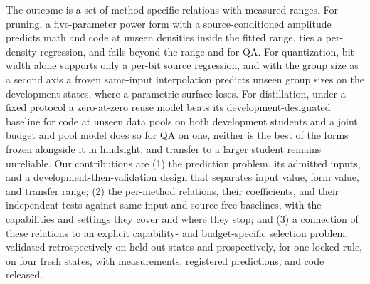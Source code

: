 The outcome is a set of method-specific relations with measured
ranges. For pruning, a five-parameter power form with a
source-conditioned amplitude predicts math and code at unseen
densities inside the fitted range, ties a per-density regression, and
fails beyond the range and for QA. For quantization, bit-width alone
supports only a per-bit source regression, and with the group size as a second axis a frozen same-input
interpolation predicts unseen group sizes on the development states,
where a parametric surface loses. For distillation, under a fixed protocol a zero-at-zero reuse model beats its development-designated baseline for code at unseen data pools on both development students and a joint budget and pool model does so for QA on one, neither is the best of the forms frozen alongside it in hindsight, and transfer to a larger student remains unreliable. Our
contributions are (1) the prediction problem, its admitted inputs, and
a development-then-validation design that separates input value, form
value, and transfer range; (2) the per-method relations, their
coefficients, and their independent tests against same-input and
source-free baselines, with the capabilities and settings they cover
and where they stop; and (3) a connection of these relations to an explicit capability-
and budget-specific selection problem, validated retrospectively on
held-out states and prospectively, for one locked rule, on four fresh
states, with measurements, registered predictions, and code released.
